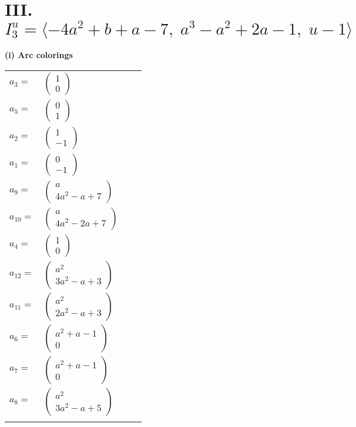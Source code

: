 \documentclass[1p]{elsarticle_modified}
\theoremstyle{definition}
\begin{document}
\centering \section*{III. $I^u_{3}= \langle -4 a^2+b+a-7,\;a^3- a^2+2 a-1,\;u-1 \rangle$}
\flushleft \textbf{(i) Arc colorings}\\
\begin{tabular}{m{7pt} m{180pt} m{7pt} m{180pt} }
\flushright $a_{3}=$&$\begin{pmatrix}1\\0\end{pmatrix}$ \\
\flushright $a_{5}=$&$\begin{pmatrix}0\\1\end{pmatrix}$ \\
\flushright $a_{2}=$&$\begin{pmatrix}1\\-1\end{pmatrix}$ \\
\flushright $a_{1}=$&$\begin{pmatrix}0\\-1\end{pmatrix}$ \\
\flushright $a_{9}=$&$\begin{pmatrix}a\\4 a^2- a+7\end{pmatrix}$ \\
\flushright $a_{10}=$&$\begin{pmatrix}a\\4 a^2-2 a+7\end{pmatrix}$ \\
\flushright $a_{4}=$&$\begin{pmatrix}1\\0\end{pmatrix}$ \\
\flushright $a_{12}=$&$\begin{pmatrix}a^2\\3 a^2- a+3\end{pmatrix}$ \\
\flushright $a_{11}=$&$\begin{pmatrix}a^2\\2 a^2- a+3\end{pmatrix}$ \\
\flushright $a_{6}=$&$\begin{pmatrix}a^2+a-1\\0\end{pmatrix}$ \\
\flushright $a_{7}=$&$\begin{pmatrix}a^2+a-1\\0\end{pmatrix}$ \\
\flushright $a_{8}=$&$\begin{pmatrix}a^2\\3 a^2- a+5\end{pmatrix}$\\&\end{tabular}
\end{document}
